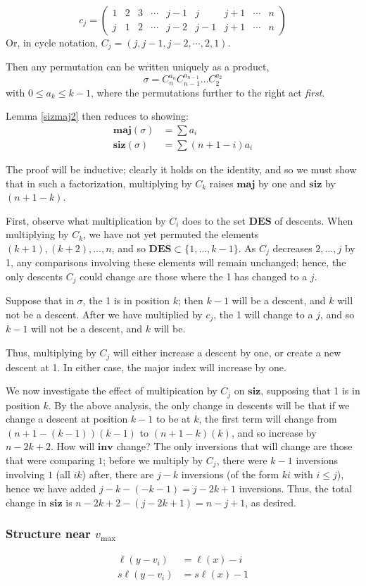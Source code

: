 \documentclass{amsart}[12pt]
\theoremstyle{definition}
\newcommand{\sk}{s\ell}
\newcommand{\inv}{\mathbf{inv}}
\newcommand{\DES}{\mathbf{DES}}
\newcommand{\maj}{\mathbf{maj}}
\newcommand{\siz}{\mathbf{siz}}
\begin{document}
$$c_j=\begin{pmatrix} 
1 & 2 & 3 & \cdots & j-1 & j & j+1 & \cdots & n \\
j & 1 & 2 & \cdots & j-2 & j-1 & j+1 & \cdots & n
\end{pmatrix}$$
Or, in cycle notation, $C_j=(j,j-1,j-2,\cdots, 2,1)$.

Then any permutation can be written uniquely as a product,
$$\sigma=C_n^{a_n}C_{n-1}^{a_{n-1}}\dots C_2^{a_2}$$
with $0\leq a_k \leq k-1$, where the permutations further to the right act \emph{first}.

Lemma \ref{sizmaj2} then reduces to showing:
\begin{align*}
\maj(\sigma)&=\sum a_i \\
\siz(\sigma)&=\sum (n+1-i) a_i
\end{align*}

The proof will be inductive;  clearly it holds on the identity, and so we must show that in such a factorization, multiplying by $C_k$ raises $\maj$ by one and $\siz$ by $(n+1-k)$.

First, observe what multiplication by $C_i$ does to the set $\DES$ of descents.  When multiplying by $C_k$, we have not yet permuted the elements $(k+1), (k+2),\dots, n$, and so $\DES\subset \{1,\dots, k-1\}$. As $C_j$ decreases $2,\dots, j$ by 1, any comparisons involving these elements will remain unchanged; hence, the only descents $C_j$ could change are those where the 1 has changed to a $j$.

Suppose that in $\sigma$, the 1 is in position $k$; then $k-1$ will be a descent, and $k$ will not be a descent.  After we have multiplied by $c_j$, the 1 will change to a $j$, and so $k-1$ will not be a descent, and $k$ will be.

Thus, multiplying by $C_j$ will either increase a descent by one, or create a new descent at 1.  In either case, the major index will 
increase by one.

We now investigate the effect of multipication by $C_j$ on $\siz$, supposing that 1 is in position $k$.  By the above analysis, the only change in descents will be that  if we change a descent at position $k-1$ to be at $k$, the first term will change from $(n+1-(k-1))(k-1)$ to $(n+1-k)(k)$, and so increase by $n-2k+2$.  How will $\inv$ change?  The only inversions that will change are those that were comparing $1$; before we multiply by $C_j$, there were $k-1$ inversions involving $1$ (all $ik$) after, there are $j-k$ inversions (of the form $ki$ with $i\leq j$), hence we have added $j-k-(-k-1)=j-2k+1$ inversions.  Thus, the total change in $\siz$ is $n-2k+2-(j-2k+1)=n-j+1$, as desired.




  




\subsubsection{Structure near $v_{\max}$}
\begin{align*}
\ell(y-v_i) &= \ell(x)-i  \\
\sk(y-v_i) &= \sk(x)-1
\end{align*}





\end{document}
